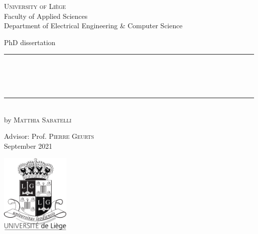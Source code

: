 
\begin{titlepage}
	\begin{addmargin}[-1cm]{-3cm}
    \begin{center}
        \large
        {\Large \textsc{University of Li{\`e}ge}}\\[1ex]
        Faculty of Applied Sciences\\
        Department of Electrical Engineering \& Computer Science\\

        \vfill

        PhD dissertation\\ \vskip1cm
        \rule{14cm}{0.4pt}\\ \bigskip
        \begingroup
            \Large
            \color{Maroon}\spacedallcaps{\myTitle} \\ \bigskip
        \endgroup
        \spacedlowsmallcaps{\mySubtitle} \\ \bigskip
        \rule{14cm}{0.4pt}\\ \vskip1cm
        by \textsc{Matthia Sabatelli}

        \vfill
        \vfill
        \vfill

        \hfill Advisor: Prof. \textsc{Pierre Geurts}\\
        \hfill September 2021
    \end{center}
    \vspace{-3.5cm}\includegraphics[width=0.25\textwidth]{Images/blason.pdf}
  \end{addmargin}
\end{titlepage}
